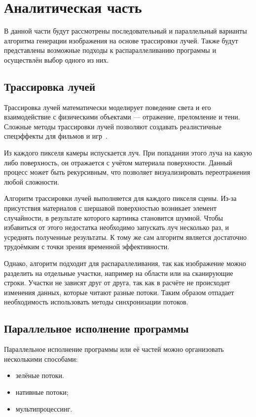\chapter{Аналитическая часть}

В данной части будут рассмотрены последовательный и параллельный варианты алгоритма генерации изображения на основе трассировки лучей. Также будут представлены возможные подходы к распараллеливанию программы и осуществлён выбор одного из них.

\section{Трассировка лучей}

Трассировка лучей математически моделирует поведение света и его взаимодействие с физическими объектами --- отражение, преломление и тени. Сложные методы трассировки лучей позволяют создавать реалистичные спецэффекты для фильмов и игр~\cite{lit1}.

Из каждого пикселя камеры испускается луч. При попадании этого луча на какую либо поверхность, он отражается с учётом материала поверхности. 
Данный процесс может быть рекурсивным, что позволяет визуализировать
переотражения любой сложности.

Алгоритм трассировки лучей выполняется для каждого пикселя сцены. Из-за присутствия материалов с шершавой поверхностью возникает элемент случайности, в результате которого картинка становится шумной. Чтобы избавиться от этого недостатка необходимо запускать луч несколько раз, и усреднять полученные результаты. К тому же сам алгоритм является достаточно трудоёмким с точки зрения временной эффективности.

Однако, алгоритм подходит для распараллеливания, так как изображение можно разделить на отдельные участки, например на области или на сканирующие строки. Участки не зависят друг от друга, так как в расчёте не происходит изменения данных, которые читают разные потоки. Таким образом отпадает необходимость использовать методы синхронизации потоков.

\section{Параллельное исполнение программы}

Параллельное исполнение программы или её частей можно организовать несколькими способами:
\begin{itemize}
	\item зелёные потоки.
	\item нативные потоки;
	\item мультипроцессинг.
\end{itemize}

